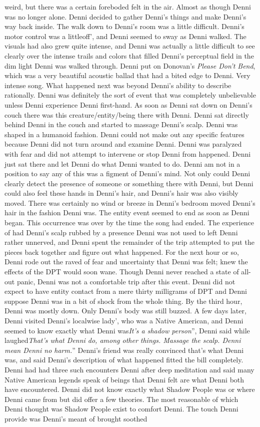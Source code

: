 \documentclass[12pt]{book}
\begin{document}
weird, but there was a certain foreboded felt in the air. Almost as though Denni was no longer alone. Denni decided to gather Denni's things and make Denni's way back inside. The walk down to Denni's room was a little difficult. Denni's motor control was a littleoff', and Denni seemed to sway as Denni walked. The visuals had also grew quite intense, and Denni was actually a little difficult to see clearly over the intense trails and colors that filled Denni's perceptual field in the dim light Denni was walked through. Denni put on Donovan's \emph{Please Don't Bend}, which was a very beautiful acoustic ballad that had a bited edge to Denni. Very intense song. What happened next was beyond Denni's ability to describe rationally. Denni was definitely the sort of event that was completely unbelievable unless Denni experience Denni first-hand. As soon as Denni sat down on Denni's couch there was this creature/entity/being there with Denni. Denni sat directly behind Denni in the couch and started to massage Denni's scalp. Denni was shaped in a humanoid fashion. Denni could not make out any specific features because Denni did not turn around and examine Denni. Denni was paralyzed with fear and did not attempt to intervene or stop Denni from happened. Denni just sat there and let Denni do what Denni wanted to do. Denni am not in a position to say any of this was a figment of Denni's mind. Not only could Denni clearly detect the presence of someone or something there with Denni, but Denni could also feel these hands in Denni's hair, and Denni's hair was also visibly moved. There was certainly no wind or breeze in Denni's bedroom moved Denni's hair in the fashion Denni was. The entity event seemed to end as soon as Denni began. This occurrence was over by the time the song had ended. The experience of had Denni's scalp rubbed by a presence Denni was not used to left Denni rather unnerved, and Denni spent the remainder of the trip attempted to put the pieces back together and figure out what happened. For the next hour or so, Denni rode out the raved of fear and uncertainty that Denni was felt; knew the effects of the DPT would soon wane. Though Denni never reached a state of all-out panic, Denni was not a comfortable trip after this event. Denni did not expect to have entity contact from a mere thirty milligrams of DPT and Denni suppose Denni was in a bit of shock from the whole thing. By the third hour, Denni was mostly down. Only Denni's body was still buzzed. A few days later, Denni visited Denni's localwise lady', who was a Native American, and Denni seemed to know exactly what Denni was\emph{It's a shadow person}'', Denni said while laughed\emph{That's what Denni do, among other things. Massage the scalp. Denni mean Denni no harm.}'' Denni's friend was really convinced that's what Denni was, and said Denni's description of what happened fitted the bill completely. Denni had had three such encounters Denni after deep meditation and said many Native American legends speak of beings that Denni felt are what Denni both have encountered. Denni did not know exactly what Shadow People was or where Denni came from but did offer a few theories. The most reasonable of which Denni thought was Shadow People exist to comfort Denni. The touch Denni provide was Denni's meant of brought soothed 
\end{document}
